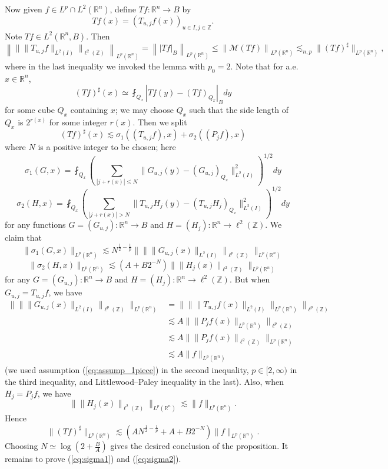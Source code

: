 \documentclass[12pt,leqno]{amsart}
\def\R{\mathbb{R}}
\def\Z{\mathbb{Z}}
\theoremstyle{plain}
\numberwithin{equation}{section}
\begin{document}
Now given $f \in L^p \cap L^2(\R^n)$, define $Tf \colon \R^n \to B$ by
\[
Tf(x) = \left( T_{u,j} f(x) \right)_{u \in I, j \in \Z}.
\]
Note $Tf \in L^2(\R^n,B)$. Then
\[
\left\| \| \|T_{u,j} f\|_{L^2(I)} \|_{\ell^2(\Z)} \right\|_{L^p(\R^n)}
= \left\| |Tf|_B \right\|_{L^p(\R^n)}
\leq \left\| \mathcal{M}(Tf) \right\|_{L^p(\R^n)}
\lesssim_{n,p} \|(Tf)^{\sharp}\|_{L^p(\R^n)},
\]
where in the last inequality we invoked the lemma with $p_0 = 2$.
Note that for a.e. $x \in \R^n$,
\[
(Tf)^{\sharp}(x) \simeq \fint_{Q_x} |Tf(y) - (Tf)_{Q_x}|_B dy
\]
for some cube $Q_x$ containing $x$; we may choose $Q_x$ such that the side length of $Q_x$ is $2^{r(x)}$ for some integer $r(x)$. Then we split
\[
(Tf)^{\sharp}(x) \lesssim \sigma_1((T_{u,j}f),x) + \sigma_2((P_j f),x)
\]
where $N$ is a positive integer to be chosen; here
\[
\sigma_1(G,x) = \fint_{Q_x} \left( \sum_{|j +r(x)| \leq N} \|G_{u,j}(y)-(G_{u,j})_{Q_x} \|_{L^2(I)}^2 \right)^{1/2} dy
\]
\[
\sigma_2(H,x) = \fint_{Q_x} \left( \sum_{|j +r(x)| > N} \|T_{u,j} H_j (y) - (T_{u,j} H_j)_{Q_x} \|_{L^2(I)}^2 \right)^{1/2} dy
\]
for any functions $G = (G_{u,j}) \colon \R^n \to B$ and $H = (H_j) \colon \R^n \to \ell^2(\Z)$. We claim that
\begin{equation} \label{eq:sigma1}
\|\sigma_1(G,x)\|_{L^p(\R^n)} \lesssim N^{\frac{1}{2}-\frac{1}{p}} \| \| \| G_{u,j}(x) \|_{L^2(I)} \|_{\ell^p(\Z)} \|_{L^p(\R^n)}
\end{equation}
\begin{equation} \label{eq:sigma2}
\|\sigma_2(H,x)\|_{L^p(\R^n)} \lesssim (A+B 2^{-N}) \| \| H_j(x)\|_{\ell^2(\Z)} \|_{L^p(\R^n)}
\end{equation}
for any $G = (G_{u,j}) \colon \R^n \to B$ and $H = (H_j) \colon \R^n \to \ell^2(\Z)$.
But when $G_{u,j} = T_{u,j} f$, we have
\begin{align*}
\| \| \| G_{u,j}(x) \|_{L^2(I)} \|_{\ell^p(\Z)} \|_{L^p(\R^n)} 
&= \| \| \| T_{u,j}f(x) \|_{L^2(I)} \|_{L^p(\R^n)}  \|_{\ell^p(\Z)}\\
&\lesssim A \| \| P_j f(x) \|_{L^p(\R^n)} \|_{\ell^p(\Z)} \\
&\lesssim A \| \| P_j f(x) \|_{\ell^2(\Z)} \|_{L^p(\R^n)} \\
&\lesssim A \|f\|_{L^p(\R^n)} 
\end{align*}
(we used assumption (\ref{eq:assump_1piece}) in the second inequality, $p \in [2, \infty)$ in the third inequality, and Littlewood--Paley inequality in the last). Also, when $H_j = P_j f$, we have
\[ \| \| H_j(x)\|_{\ell^2(\Z)} \|_{L^p(\R^n)} \lesssim \|f\|_{L^p(\R^n)}. \]
Hence
\[
\|(Tf)^{\sharp}\|_{L^p(\R^n)} \lesssim (AN^{\frac{1}{2}-\frac{1}{p}} + A + B2^{-N} ) \|f\|_{L^p(\R^n)}.
\]
Choosing $N \simeq \log(2+\frac{B}{A})$ gives the desired conclusion of the proposition. It remains to prove (\ref{eq:sigma1}) and (\ref{eq:sigma2}).
\end{document}

